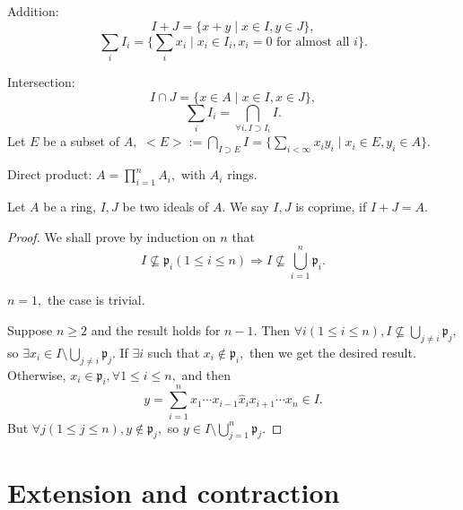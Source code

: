 Addition:
$$I+J=\{x+y\mid x\in I,y\in J\},$$
$$\sum\limits_iI_i=\{\sum\limits_ix_i\mid x_i\in I_i,x_i=0 \text{ for almost all }i\}.$$

Intersection:
$$I\cap J=\{x\in A\mid x\in I, x\in J\},$$
$$\sum\limits_i I_i = \bigcap\limits_{\forall i, I\supset I_i} I.$$
Let $E$ be a subset of $A,$ $<E>:= \bigcap\limits_{I\supset E} I =
\{\sum\limits_{i<\infty} x_iy_i\mid x_i\in E, y_i\in A\}.$

Direct product: $A=\prod\limits_{i=1}^n A_i,$ with $A_i$ rings.
\begin{Def}
Let $A$ be a ring, $I,J$ be two ideals of $A.$ We say $I,J$ is
coprime, if $I+J=A.$
\end{Def}
\begin{proof}
We shall prove by induction on $n$ that
$$I\nsubseteq \mathfrak{p}_i(1\leqslant i\leqslant n)\Longrightarrow
I\nsubseteq \bigcup\limits_{i=1}^n \mathfrak{p}_i.$$

$n=1,$ the case is trivial.

Suppose $n\geqslant 2$ and the result holds for $n-1.$ Then $\forall
i(1\leqslant i\leqslant n), I\nsubseteq \bigcup\limits_{j\neq i}
\mathfrak{p}_j,$ so $\exists x_i\in I\setminus \bigcup\limits_{j\neq
i} \mathfrak{p}_j.$ If $\exists i$ such that $x_i\not\in
\mathfrak{p}_i,$ then we get the desired result. Otherwise, $x_i\in
\mathfrak{p}_i, \forall 1\leqslant i\leqslant n,$ and then
$$y = \sum\limits_{i=1}^n x_1\cdots x_{i-1}\hat{x}_ix_{i+1}\cdots x_n\in
I.$$ But $\forall j(1\leqslant j\leqslant n), y\not\in
\mathfrak{p}_j,$ so $y\in I\setminus \bigcup\limits_{j=1}^n
\mathfrak{p}_j.$
\end{proof}

\newpage

\section{Extension and contraction}

